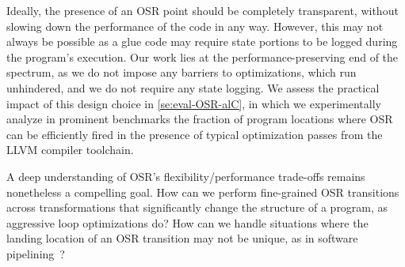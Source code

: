 Ideally, the presence of an OSR point should be completely transparent, without slowing down the performance of the code in any way. However, this may not always be possible as a glue code may require state portions to be logged during the program's execution. Our work lies at the performance-preserving end of the spectrum, as we do not impose any barriers to optimizations, which run unhindered, and we do not require any state logging. We assess the practical impact of this design choice in \mysection\ref{se:eval-OSR-alC}, in which we experimentally analyze in prominent benchmarks the fraction of program locations where OSR can be efficiently fired in the presence of typical optimization passes from the LLVM compiler toolchain.


A deep understanding of OSR's flexibility/performance trade-offs remains nonetheless a compelling goal. How can we perform fine-grained OSR transitions across transformations that significantly change the structure of a program, as aggressive loop optimizations do? How can we handle situations where the landing location of an OSR transition may not be unique, as in software pipelining~\cite{Kundu09}? %

